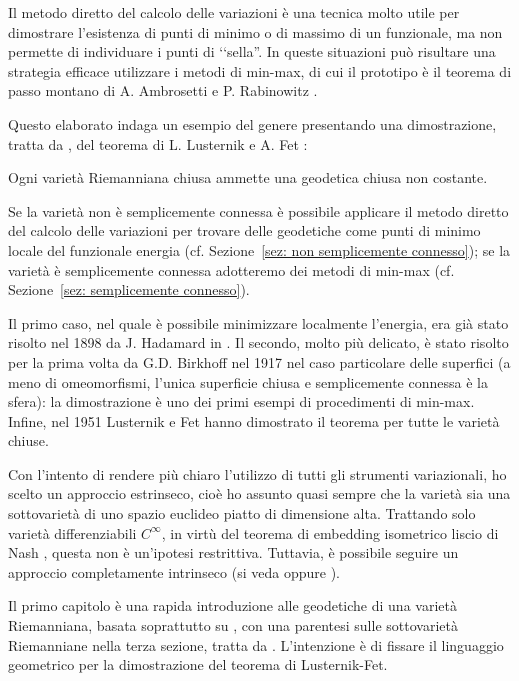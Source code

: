 
Il metodo diretto del calcolo delle variazioni è una tecnica molto utile per dimostrare l'esistenza di punti di minimo o di massimo di un funzionale, ma non permette di individuare i punti di ‘‘sella''. In queste situazioni può risultare una strategia efficace utilizzare i metodi di min-max, di cui il prototipo è il teorema di passo montano di A. Ambrosetti e P. Rabinowitz \cite{ambrosetti1973dual}.

Questo elaborato indaga un esempio del genere presentando una dimostrazione, tratta da \cite{klingenberg1995riemannian}, del teorema di L. Lusternik e A. Fet \cite{lusternik1951variational}:
\begin{teoLF}
	Ogni varietà Riemanniana chiusa ammette una geodetica chiusa non costante. 
\end{teoLF}
Se la varietà non è semplicemente connessa è possibile applicare il metodo diretto del calcolo delle variazioni per trovare delle geodetiche come punti di minimo locale del funzionale energia (cf. Sezione~\ref{sez: non semplicemente connesso}); se la varietà è semplicemente connessa adotteremo dei metodi di min-max (cf. Sezione~\ref{sez: semplicemente connesso}). 

Il primo caso, nel quale è possibile minimizzare localmente l'energia, era già stato risolto nel 1898 da J. Hadamard in \cite{hadamard1898surfaces}. Il secondo, molto più delicato, è stato risolto per la prima volta da G.D. Birkhoff nel 1917 nel caso particolare delle superfici (a meno di omeomorfismi, l'unica superficie chiusa e semplicemente connessa è la sfera): la dimostrazione è uno dei primi esempi di procedimenti di min-max. Infine, nel 1951 Lusternik e Fet hanno dimostrato il teorema per tutte le varietà chiuse. 

Con l'intento di rendere più chiaro l'utilizzo di tutti gli strumenti variazionali, ho scelto un approccio estrinseco, cioè ho assunto quasi sempre che la varietà sia una sottovarietà di uno spazio euclideo piatto di dimensione alta. Trattando solo varietà differenziabili  \(C^\infty\), in virtù del teorema di embedding isometrico liscio di Nash \cite{nash1956imbedding}, questa non è un'ipotesi restrittiva. Tuttavia, è possibile seguire un approccio completamente intrinseco (si veda \cite{klingenberg1995riemannian} oppure \cite{klingenberg2012lectures}).

Il primo capitolo è una rapida introduzione alle geodetiche di una varietà Riemanniana, basata soprattutto su \cite{milnor1963morse}, con una parentesi sulle sottovarietà Riemanniane nella terza sezione, tratta da \cite{lee1997riemannian}. L'intenzione è di fissare il linguaggio geometrico per la dimostrazione del teorema di Lusternik-Fet.

